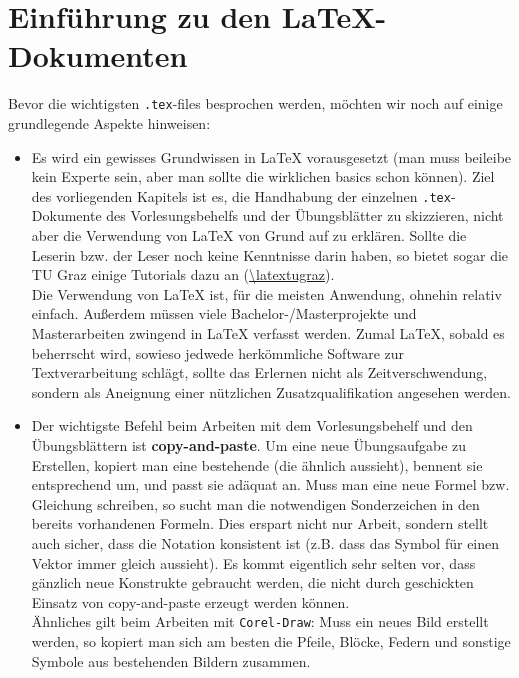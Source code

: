 \chapter{Einf\"{u}hrung zu den \LaTeX-Dokumenten}

Bevor die wichtigsten {\tt .tex}-files besprochen werden, möchten wir noch auf
einige grundlegende Aspekte hinweisen:

\begin{itemize}
  \item Es wird ein gewisses Grundwissen in \LaTeX{} vorausgesetzt (man muss
    beileibe kein Experte sein, aber man sollte die wirklichen basics schon
    können). Ziel des vorliegenden Kapitels ist es, die Handhabung der 
    einzelnen {\tt .tex}-Dokumente des Vorlesungsbehelfs und der Übungsblätter
    zu skizzieren, nicht aber die Verwendung von \LaTeX{} von Grund auf zu 
    erklären. Sollte die Leserin bzw. der Leser noch keine Kenntnisse darin 
    haben, so  bietet sogar die TU Graz einige Tutorials dazu an 
    (\url{\latextugraz}).\\
    Die Verwendung von \LaTeX{} ist, für die meisten Anwendung, ohnehin relativ
    einfach. Außerdem müssen viele Bachelor-/Masterprojekte und Masterarbeiten
    zwingend in \LaTeX{} verfasst werden. Zumal \LaTeX{}, sobald es beherrscht
    wird, sowieso jedwede herkömmliche Software zur Textverarbeitung schlägt,
    sollte das Erlernen nicht als Zeitverschwendung, sondern als Aneignung einer
    nützlichen Zusatzqualifikation angesehen werden.
  \item Der wichtigste Befehl beim Arbeiten mit dem Vorlesungsbehelf und
    den Übungsblättern ist {\bf copy-and-paste}. Um eine neue Übungsaufgabe zu
    Erstellen, kopiert man eine bestehende (die ähnlich aussieht), bennent sie
    entsprechend um, und passt sie adäquat an. Muss man eine neue Formel
    bzw. Gleichung schreiben, so sucht man die notwendigen Sonderzeichen in den
    bereits vorhandenen Formeln. Dies erspart nicht nur Arbeit, sondern stellt
    auch sicher, dass die Notation konsistent ist (z.B. dass das Symbol für 
    einen Vektor immer gleich aussieht). Es kommt eigentlich sehr selten vor, 
    dass gänzlich neue Konstrukte gebraucht werden, die nicht durch geschickten
    Einsatz von copy-and-paste erzeugt werden können.\\
    Ähnliches gilt beim Arbeiten mit {\tt Corel-Draw}: Muss ein neues Bild
    erstellt werden, so kopiert man sich am besten die Pfeile, Blöcke, Federn
    und sonstige Symbole aus bestehenden Bildern zusammen.
\end{itemize}

